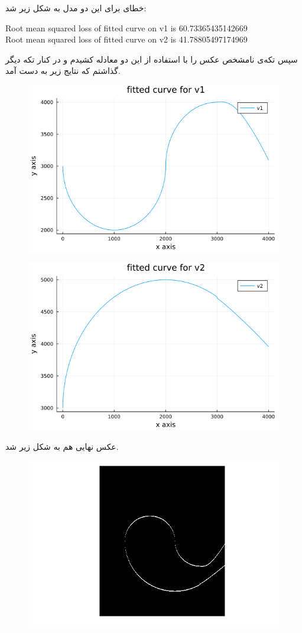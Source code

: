 \documentclass[a4paper]{article}
\begin{document}
خطای 
برای این دو مدل به شکل زیر شد: 
\begin{center}
	\begin{latin}
	Root mean squared loss of fitted curve on v1 is 60.73365435142669
	\\
	Root mean squared loss of fitted curve on v2 is 41.78805497174969
\end{latin}
\end{center}
سپس تکه‌ی نامشخص عکس را با استفاده از این دو معادله کشیدم و در کنار تکه دیگر گذاشتم که نتایج زیر به دست آمد.
\begin{figure}[H]
	\centering
	\includegraphics[width=0.75 \linewidth]{V1_curve}
	\caption{
	}
\end{figure}
\begin{figure}[H]
	\centering
	\includegraphics[width=0.75 \linewidth]{V2_curve}
	\caption{
	}
\end{figure}
عکس نهایی هم به شکل زیر شد.
\begin{figure}[H]
	\centering
	\includegraphics[width=0.75 \linewidth]{Reconstructed_Image}
	\caption{
	}
\end{figure}
\end{document}
